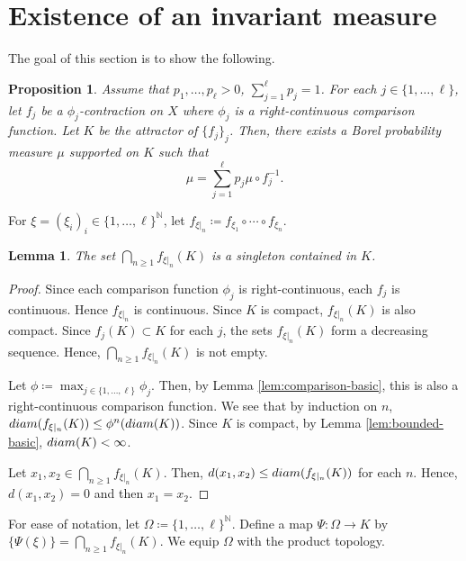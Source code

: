 \documentclass[10pt,a4paper]{amsart}
\newtheorem{Lem}[Thm]{Lemma}
\newtheorem{Prop}[Thm]{Proposition}
\begin{document}
\section{Existence of an invariant measure}\label{sec:inv-measure}

The goal of this section is to show the following. 

\begin{Prop}\label{prop:exist-inv-measure}
Assume that $p_1, \dots, p_{\ell} > 0$, $\sum_{j = 1}^{\ell} p_j = 1$. 
For each $j \in \{1, \dots, \ell\}$, 
let $f_j$ be a $\phi_j$-contraction on $X$ where $\phi_j$ is a right-continuous comparison function. 
Let $K$ be the attractor of $\{f_j\}_j$. 
Then, there exists a Borel probability measure $\mu$ supported on $K$ such that 
\begin{equation}\label{eq:invariance-measure} 
\mu = \sum_{j = 1}^{\ell} p_j \mu \circ f_j^{-1}. 
\end{equation}
\end{Prop}

For $\xi = (\xi_i)_i \in \{1, \dots, \ell\}^{\mathbb N}$, 
let  $f_{\xi|_{n}} \coloneqq f_{\xi_1} \circ \cdots \circ f_{\xi_n}$. 

\begin{Lem}
The set $\bigcap_{n \ge 1} f_{\xi|_{n}}(K)$ is a singleton contained in $K$. 
\end{Lem}

\begin{proof}
Since each comparison function $\phi_j$ is right-continuous, each $f_j$ is continuous. 
Hence $f_{\xi|_{n}}$ is continuous. 
Since $K$ is compact, $f_{\xi|_{n}}(K)$ is also compact. 
Since $f_j (K) \subset K$ for each $j$, the sets $f_{\xi|_{n}}(K)$ form a decreasing sequence. 
Hence, $\bigcap_{n \ge 1}  f_{\xi|_{n}}(K)$ is not empty. 

Let $\phi \coloneqq \max_{j \in \{1, \dots, \ell\}} \phi_j$. 
Then, by Lemma \ref{lem:comparison-basic}, this is also a right-continuous comparison function. 
We see that by induction on $n$, 
$\textup{diam}( f_{\xi|_{n}}(K)) \le \phi^n (\textup{diam}(K))$. 
Since $K$ is compact, by Lemma \ref{lem:bounded-basic}, $\textup{diam}(K) < \infty$.  
 
Let $x_1, x_2 \in \bigcap_{n \ge 1}  f_{\xi|_{n}}(K)$. 
Then, $d(x_1, x_2) \le \textup{diam}( f_{\xi|_{n}}(K))$ for each $n$. 
Hence, $d(x_1, x_2) = 0$ and then $x_1 = x_2$. 
\end{proof}

For ease of notation, let $\Omega \coloneqq \{1, \dots, \ell\}^{\mathbb N}$. 
Define a map $\Psi \colon \Omega \to K$ by $\{\Psi(\xi)\} = \bigcap_{n \ge 1} f_{\xi|_{n}}(K)$.  
We equip $\Omega$ with the product topology. 
\end{document}
